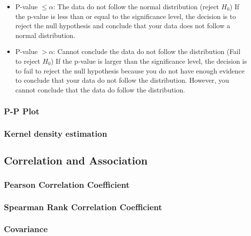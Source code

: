 \documentclass[11pt]{article}
\providecommand{\tightlist}{%
      \setlength{\itemsep}{0pt}\setlength{\parskip}{0pt}}
\begin{document}
\begin{itemize}
\tightlist
\item
  P-value \(\leq \alpha\): The data do not follow the normal
  distribution (reject \(H_0\)) If the p-value is less than or equal to
  the significance level, the decision is to reject the null hypothesis
  and conclude that your data does not follow a normal distribution.
\item
  P-value \(> \alpha\): Cannot conclude the data do not follow the
  distribution (Fail to reject \(H_0\)) If the p-value is larger than
  the significance level, the decision is to fail to reject the null
  hypothesis because you do not have enough evidence to conclude that
  your data do not follow the distribution. However, you cannot conclude
  that the data do follow the distribution.
\end{itemize}

\hypertarget{p-p-plot}{%
\subsubsection{P-P Plot}\label{p-p-plot}}

\hypertarget{kernel-density-estimation}{%
\subsubsection{Kernel density estimation}\label{kernel-density-estimation}}

\hypertarget{correlation-and-association}{%
\subsection{Correlation and Association}\label{correlation-and-association}}

\hypertarget{pearson-correlation-coefficient}{%
\subsubsection{Pearson Correlation Coefficient}\label{pearson-correlation-coefficient}}

\hypertarget{spearman-rank-correlation-coefficient}{%
\subsubsection{Spearman Rank Correlation Coefficient}\label{spearman-rank-correlation-coefficient}}

\hypertarget{covariance}{%
\subsubsection{Covariance}\label{covariance}}
\end{document}
